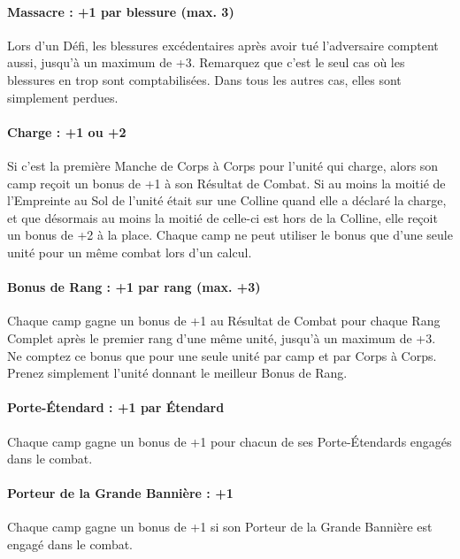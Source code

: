 \paragraph{Massacre : +1 par blessure (max. 3)}

Lors d'un Défi, les blessures excédentaires après avoir tué l'adversaire comptent aussi, jusqu'à un maximum de +3. Remarquez que c'est le seul cas où les blessures en trop sont comptabilisées. Dans tous les autres cas, elles sont simplement perdues.

\paragraph{Charge : +1 ou +2}

Si c'est la première Manche de Corps à Corps pour l'unité qui charge, alors son camp reçoit un bonus de +1 à son Résultat de Combat. Si au moins la moitié de l'Empreinte au Sol de l'unité était sur une Colline quand elle a déclaré la charge, et que désormais au moins la moitié de celle-ci est hors de la Colline, elle reçoit un bonus de +2 à la place. Chaque camp ne peut utiliser le bonus que d'une seule unité pour un même combat lors d'un calcul.

\paragraph{Bonus de Rang : +1 par rang (max. +3)}

Chaque camp gagne un bonus de +1 au Résultat de Combat pour chaque Rang Complet après le premier rang d'une même unité, jusqu'à un maximum de +3. Ne comptez ce bonus que pour une seule unité par camp et par Corps à Corps. Prenez simplement l'unité donnant le meilleur Bonus de Rang.

\paragraph{Porte-Étendard : +1 par Étendard}

Chaque camp gagne un bonus de +1 pour chacun de ses Porte-Étendards engagés dans le combat.

\paragraph{Porteur de la Grande Bannière : +1}

Chaque camp gagne un bonus de +1 si son Porteur de la Grande Bannière est engagé dans le combat.

